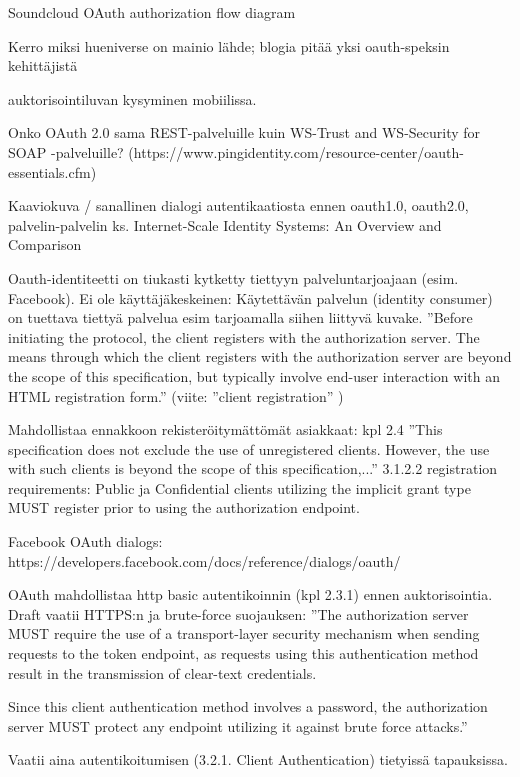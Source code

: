 \documentclass[finnish,gradu]{tktltiki}
\begin{document}
  Soundcloud OAuth authorization flow diagram %

  Kerro miksi hueniverse on mainio lähde; blogia pitää yksi oauth-speksin kehittäjistä

  auktorisointiluvan kysyminen mobiilissa.

  Onko OAuth 2.0 sama REST-palveluille kuin WS-Trust and WS-Security for SOAP -palveluille? (https://www.pingidentity.com/resource-center/oauth-essentials.cfm)

  Kaaviokuva / sanallinen dialogi autentikaatiosta ennen oauth1.0, oauth2.0, palvelin-palvelin
  ks. Internet-Scale Identity Systems: An Overview and Comparison

  Oauth-identiteetti on tiukasti kytketty tiettyyn palveluntarjoajaan (esim. Facebook).
  Ei ole käyttäjäkeskeinen: Käytettävän palvelun (identity consumer) on tuettava tiettyä palvelua esim tarjoamalla siihen liittyvä kuvake.
  ''Before initiating the protocol, the client registers with the authorization server. The means through which the client registers with the authorization
  server are beyond the scope of this specification, but typically involve end-user interaction with an HTML registration form.'' (viite: ''client registration'' \cite{ietf_oauth2})

  Mahdollistaa ennakkoon rekisteröitymättömät asiakkaat: kpl 2.4 ''This specification does not exclude the use of unregistered clients. However, the use with
  such clients is beyond the scope of this specification,...''
  3.1.2.2 registration requirements:
    Public ja Confidential clients utilizing the implicit grant type MUST register prior to using the authorization endpoint.


  Facebook OAuth dialogs: https://developers.facebook.com/docs/reference/dialogs/oauth/

  OAuth mahdollistaa http basic autentikoinnin (kpl 2.3.1) ennen auktorisointia.
  Draft vaatii HTTPS:n ja brute-force suojauksen:
    ''The authorization server MUST require the use of a transport-layer
     security mechanism when sending requests to the token endpoint, as
     requests using this authentication method result in the transmission
     of clear-text credentials.

     Since this client authentication method involves a password, the
     authorization server MUST protect any endpoint utilizing it against
     brute force attacks.''

  Vaatii aina autentikoitumisen (3.2.1. Client Authentication) tietyissä tapauksissa.
\end{document}
